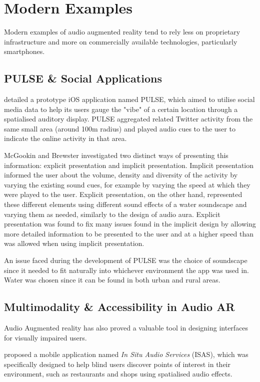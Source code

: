 \documentclass{l4proj}
\begin{document}
\section{Modern Examples}
Modern examples of audio augmented reality tend to rely less on proprietary infrastructure and more on commercially available technologies, particularly smartphones.

\subsection{PULSE \& Social Applications}

\cite{mcgookin_pulse_2011} detailed a prototype iOS application named PULSE, which aimed to utilise social media data to help its users gauge the "vibe" of a certain location through a spatialised auditory display. 
PULSE aggregated related Twitter activity from the same small area (around 100m radius) and played audio cues to the user to indicate the online activity in that area.

McGookin and Brewster investigated two distinct ways of presenting this information: explicit presentation and implicit presentation. Implicit presentation informed the user about the volume, density and diversity of the activity by varying the existing sound cues, for example by varying the speed at which they were played to the user. Explicit presentation, on the other hand, represented these different elements using different sound effects of a water soundscape and varying them as needed, similarly to the design of audio aura. Explicit presentation was found to fix many issues found in the implicit design by allowing more detailed information to be presented to the user and at a higher speed than was allowed when using implicit presentation.

An issue faced during the development of PULSE was the choice of soundscape since it needed to fit naturally into whichever environment the app was used in. Water was chosen since it can be found in both urban and rural areas.
\subsection{Multimodality \& Accessibility in Audio AR}
Audio Augmented reality has also proved a valuable tool in designing interfaces for visually impaired users. 

\cite{puiatti_whats_2012} proposed a mobile application named \emph{In Situ Audio Services} (ISAS), which was specifically designed to help blind users discover points of interest in their environment, such as restaurants and shops using spatialised audio effects.
\end{document}
